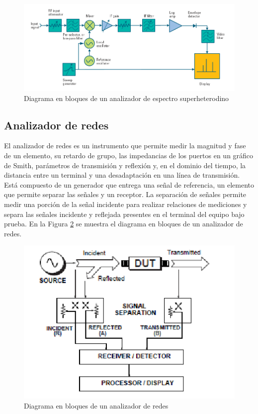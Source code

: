 \documentclass[a4paper,10pt]{article}
\begin{document}
	\begin{figure}[!htb]
		\centering
		\includegraphics[width=12cm]
		{Imagenes/diagram.png}
		\caption{Diagrama en bloques de un analizador de espectro 
		superheterodino}
		\label{diagramadebloques} 
	\end{figure}
	
	\newpage
	\subsection{Analizador de redes}
	\indent El analizador de redes es un instrumento que permite medir la 
	magnitud y fase de un elemento, su retardo de grupo, las impedancias de los 
	puertos en un gr\'afico de Smith, par\'ametros de transmisi\'on y reflexi\'on y, en 
	el dominio del tiempo, la distancia entre un terminal y una desadaptaci\'on en
	una l\'inea de transmisi\'on. \\
	\indent Est\'a compuesto de un generador que entrega una se\~nal de referencia, 
	un elemento que permite separar las se\~nales y un receptor. La separaci\'on de 
	se\~nales permite medir una porci\'on de la se\~nal incidente para realizar 
	relaciones de mediciones y separa las se\~nales incidente y reflejada 
	presentes en el terminal del equipo bajo prueba. En la Figura \ref{img:001} 
	se muestra el diagrama en bloques de un analizador de redes.

	\begin{figure}[!htb]
		\centering
		\includegraphics[width=12cm]
		{Imagenes/diagAnalRedes.png}
		\caption{Diagrama en bloques de un analizador de redes}
		\label{img:001} 
	\end{figure}
\end{document}
